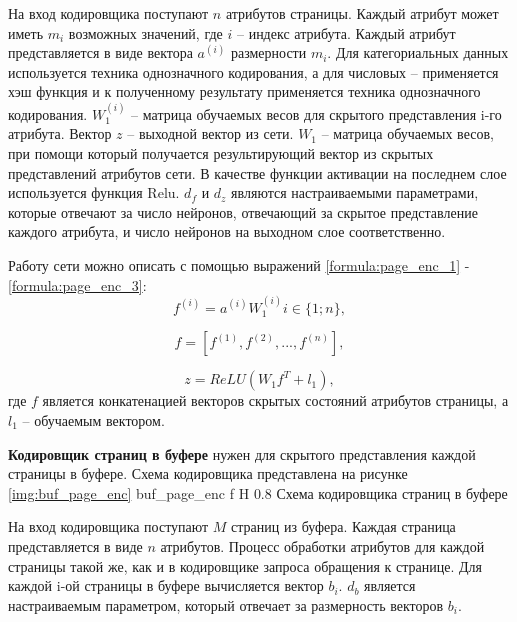 На вход кодировщика поступают $n$ атрибутов страницы.
Каждый атрибут может иметь $m_i$ возможных значений, где $i$ -- индекс атрибута.
Каждый атрибут представляется в виде вектора $a^{(i)}$ размерности $m_i$.
Для категориальных данных используется техника однозначного кодирования, а для числовых -- применяется хэш функция и к полученному результату применяется техника однозначного кодирования.
$W_1^{(i)}$ -- матрица обучаемых весов для скрытого представления i-го атрибута.
Вектор $z$ -- выходной вектор из сети.
$W_1$ -- матрица обучаемых весов, при помощи который получается результирующий вектор из скрытых представлений атрибутов сети.
В качестве функции активации на последнем слое используется функция Relu.
$d_f$ и $d_z$ являются настраиваемыми параметрами, которые отвечают за число нейронов, отвечающий за скрытое представление каждого атрибута, и число нейронов на выходном слое соответственно.

Работу сети можно описать с помощью выражений
\ref{formula:page_enc_1} - \ref{formula:page_enc_3}:
\begin{equation}\label{formula:page_enc_1}
	f^{(i)} = a^{(i)}W_1^{(i)} i \in \{1;n\},
\end{equation}

\begin{equation}\label{formula:page_enc_2}
	f = [f^{(1)}, f^{(2)}, ..., f^{(n)}],
\end{equation}

\begin{equation}\label{formula:page_enc_3}
	z = ReLU(W_1f^T + l_1),
\end{equation}
где $f$ является конкатенацией векторов скрытых состояний атрибутов страницы, а $l_1$ -- обучаемым вектором.

\textbf{Кодировщик страниц в буфере} нужен для скрытого представления каждой страницы в буфере.
Схема кодировщика представлена на рисунке \ref{img:buf_page_enc}
{buf_page_enc} %
{f} %
{H} %
{0.8\textwidth} %
{Схема кодировщика страниц в буфере} %

На вход кодировщика поступают $M$ страниц из буфера.
Каждая страница представляется в виде $n$ атрибутов.
Процесс обработки атрибутов для каждой страницы такой же, как и в кодировщике запроса обращения к странице.
Для каждой i-ой страницы в буфере вычисляется вектор $b_i$.
$d_b$ является настраиваемым параметром, который отвечает за размерность векторов $b_i$.

